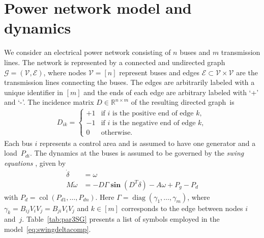 \documentclass[journal]{IEEEtran}
\newcommand{\w}{\omega}
\newcommand{\1}{\mathds 1}
\newcommand{\G}{\mathcal{G} }
\newcommand{\V}{\mathcal{V} }
\newcommand{\E}{\mathcal{E} }
\newcommand{\real}{\mathbb{R}}
\newcommand{\until}[1]{[#1]}
\DeclareMathOperator{\col}{col}
\DeclareMathOperator{\diag}{diag}
\DeclareMathOperator{\Sin}{\mathbf{sin}}
\theoremstyle{remark}
\theoremstyle{definition}
\begin{document}

\section{Power network model and dynamics}\label{sec:phys-power-netw}
We consider an electrical power network consisting of $ n $ buses and
$m$ transmission lines. The network is represented by a connected and
undirected graph $ \G = (\V, \E) $, where nodes $ \V =\until{n}$
represent buses and edges $ \E \subset \V \times \V $ are the
transmission lines connecting the buses.  The edges are arbitrarily
labeled with a unique identifier in $[m]$ and the ends of each edge
are arbitrary labeled with ‘+’ and ‘-’.  The incidence matrix $D \in
\real^{n \times m}$ of the resulting directed graph~is
\begin{align*}
  D_{ik}=
  \begin{cases}
    +1 &\text{if $i$ is the positive end of edge $k$},\\
    -1 &\text{if $i$ is the negative end of edge $k$},\\
    0 & \text{otherwise.}
  \end{cases}
\end{align*}
%
Each bus $i$ represents a control area and is assumed to have one
generator and a load~$P_{di}$.  The dynamics at the buses is assumed
to be governed by the \emph{swing equations} \cite{powsysdynwiley},
given by
\begin{equation}
  \begin{aligned}
    \dot \delta&=\w\\
    M\dot \w&= -D\Gamma\Sin (D^T\delta)-A\w+P_g-P_d
  \end{aligned}\label{eq:swingdeltacomp}
\end{equation}
with $P_d=\col(P_{d1},\ldots,P_{dn})$.  Here
$\Gamma=\diag(\gamma_1,\ldots,\gamma_m)$, where
$\gamma_k=B_{ij}V_{i}V_{j}=B_{ji}V_{i}V_{j}$ and $k\in[m]$ corresponds
to the edge between nodes $i$ and~$j$.  Table~\ref{tab:par3SG}
presents a list of symbols employed in the
model~\eqref{eq:swingdeltacomp}.
\end{document}
